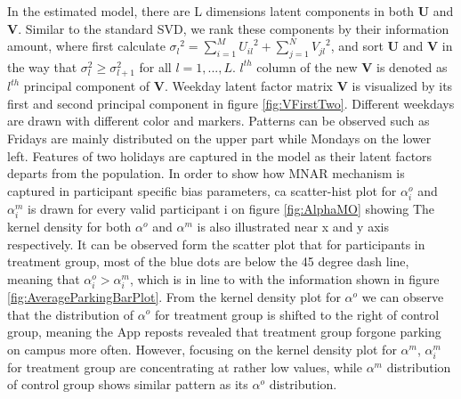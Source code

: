 \documentclass[preprint,12pt]{elsarticle}
\begin{document}
In the estimated model, there are L dimensions latent components in both $\mathbf{U}$ and $\mathbf{V}$. Similar to the standard SVD, we rank these components by their information amount, where first calculate ${\sigma _l}^2 = \sum\limits_{i = 1}^M {{U_{il}}^2}  + \sum\limits_{j = 1}^N {{V_{jl}}^2}$, and sort $\mathbf{U}$ and $\mathbf{V}$ in the way that ${\sigma _l^2}\geqslant {\sigma _{l+1}^2}$ for all $l=1,...,L$. $l^{th}$ column of the new $\mathbf{V}$ is denoted as $l^{th}$ principal component of $\mathbf{V}$. Weekday latent factor matrix $\mathbf{V}$ is visualized by its first and second principal component in figure \ref{fig:VFirstTwo}. Different weekdays are drawn with different color and markers. Patterns can be observed such as Fridays are mainly distributed on the upper part while Mondays on the lower left. Features of two holidays are captured in the model as their latent factors departs from the population. In order to show how MNAR mechanism is captured in participant specific bias parameters, ca scatter-hist plot for $\alpha^o_i$ and $\alpha^m_i$ is drawn for every valid participant i on figure \ref{fig:AlphaMO} showing The kernel density for both $\alpha^o$ and $\alpha^m$ is also illustrated near x and y axis respectively. It can be observed form the scatter plot that for participants in treatment group, most of the blue dots are below the 45 degree dash line, meaning that $\alpha^o_i>\alpha^m_i$, which is in line to with the information shown in figure \ref{fig:AverageParkingBarPlot}. From the kernel density plot for $\alpha^o$ we can observe that the distribution of $\alpha^o$ for treatment group is shifted to the right of control group, meaning the App reposts revealed that treatment group forgone parking on campus more often. However, focusing on the kernel density plot for $\alpha^m$, $\alpha^m_i$ for treatment group are concentrating at rather low values, while $\alpha^m$ distribution of control group shows similar pattern as its  $\alpha^o$ distribution. 
\end{document}
